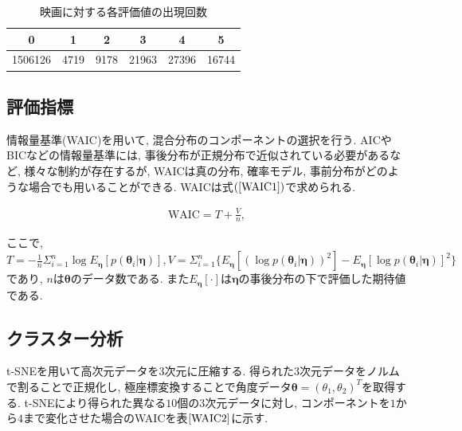 \documentclass[a4j,12pt]{jarticle}
\begin{document}
\begin{table}[tbp]
\begin{center}
\caption{映画に対する各評価値の出現回数}   %
\label{MovieLens3}   %
\begin{tabular}{c c c c c c}
\hline
0 & 1 & 2 & 3 & 4 & 5 \\ \hline 
1506126 & 4719 & 9178 & 21963 & 27396 & 16744 \\ \hline
\end{tabular}
\end{center}
\end{table}

\subsection{評価指標}

情報量基準(WAIC)を用いて, 混合分布のコンポーネントの選択を行う. AICやBICなどの情報量基準には, 事後分布が正規分布で近似されている必要があるなど, 様々な制約が存在するが, WAICは真の分布, 確率モデル, 事前分布がどのような場合でも用いることができる. WAICは式$(\ref{WAIC1})$で求められる.

\begin{eqnarray}
\label{WAIC1}
\mbox{WAIC} = T + \frac{V}{n}, 
\end{eqnarray}

\noindent
ここで, $T = - \frac{1}{n} \Sigma^n_{i=1} \log E_{\bm \eta}[p(\bm \theta_i| \bm \eta)], 
V = \Sigma^n_{i=1} \{ E_{\bm \eta}[(\log p(\bm \theta_i| \bm \eta))^2] - E_{\bm \eta}[\log p(\bm \theta_i| \bm \eta)]^2 \}$であり, $n$は$\bm \theta$のデータ数である. また$E_{\bm \eta}[\cdot]$は$\bm \eta$の事後分布の下で評価した期待値である.  

\subsection{クラスター分析}

t-SNEを用いて高次元データを$3$次元に圧縮する. 得られた$3$次元データをノルムで割ることで正規化し, 極座標変換することで角度データ$\bm \theta = (\theta_1, \theta_2)^T$を取得する. t-SNEにより得られた異なる$10$個の$3$次元データに対し, コンポーネントを$1$から$4$まで変化させた場合のWAICを表$\ref{WAIC2}$に示す. 
\end{document}
